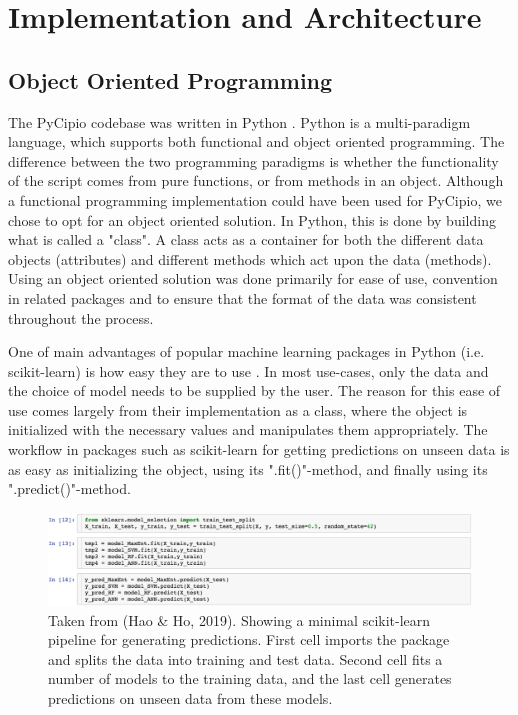 \documentclass{article}
\begin{document}
\section{Implementation and Architecture}

\subsection{Object Oriented Programming}

The PyCipio codebase was written in Python \cite{Rossum}. Python is a multi-paradigm language, which supports both functional and object oriented programming. The difference between the two programming paradigms is whether the functionality of the script comes from pure functions, or from methods in an object. Although a functional programming implementation could have been used for PyCipio, we chose to opt for an object oriented solution. In Python, this is done by building what is called a "class". A class acts as a container for both the different data objects (attributes) and different methods which act upon the data (methods). Using an object oriented solution was done primarily for ease of use, convention in related packages and to ensure that the format of the data was consistent throughout the process.

One of main advantages of popular machine learning packages in Python (i.e. scikit-learn) is how easy they are to use \cite{Hao}. In most use-cases, only the data and the choice of model needs to be supplied by the user. The reason for this ease of use comes largely from their implementation as a class, where the object is initialized with the necessary values and manipulates them appropriately. The workflow in packages such as scikit-learn for getting predictions on unseen data is as easy as initializing the object, using its ".fit()"-method, and finally using its ".predict()"-method. 

\begin{figure}[H]
    \centerline{\includegraphics{images/sklearn.jpeg}}
    \caption{Taken from (Hao \& Ho, 2019). Showing a minimal scikit-learn pipeline for generating predictions. First cell imports the package and splits the data into training and test data. Second cell fits a number of models to the training data, and the last cell generates predictions on unseen data from these models. }
\end{figure}
\end{document}
